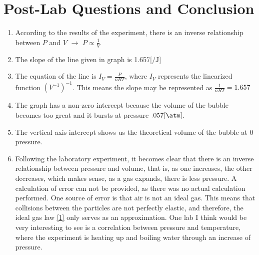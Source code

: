 \documentclass{article}
\begin{document}
\section{Post-Lab Questions and Conclusion}

\begin{enumerate}

  \item According to the results of the experiment, there is an inverse relationship between $P$ and $V$ $\rightarrow$ $P\propto\frac{1}{V}$

  \item The slope of the line given in graph  is 1.657[$\si{\per\joule}$]

  \item The equation of the line is $I_V=\frac{P}{nRT}$, where $I_V$ represents the linearized function $\left( V^{-1} \right)^{-1}$. This means the slope may be represented as $\frac{1}{nRT}=1.657$

  \item The graph has a non-zero intercept because the volume of the bubble becomes too great and it bursts at pressure $.057[\si{\atm}]$.

  \item The vertical axis intercept shows us the theoretical volume of the bubble at 0 pressure.

  \item Following the laboratory experiment, it becomes clear that there is an inverse relationship between pressure and volume, that is, as one increases, the other decreases, which makes sense, as a gas expands, there is less pressure. A calculation of error can not be provided, as there was no actual calculation performed. One source of error is that air is not an ideal gas. This means that collisions between the particles are not perfectly elastic, and therefore, the ideal gas law \eqref{1} only serves as an approximation. One lab I think would be very interesting to see is a correlation between pressure and temperature, where the experiment is heating up and boiling water through an increase of pressure.

\end{enumerate}

\newpage
    
\end{document}
